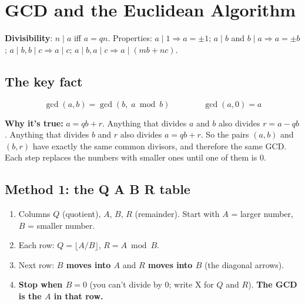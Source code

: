 \section{GCD and the Euclidean Algorithm}

\textbf{Divisibility}: $n \mid a$ iff $a = qn$. Properties: $a \mid 1 \Rightarrow a = \pm1$; $a \mid b$ and $b \mid a \Rightarrow a = \pm b$; $a \mid b, b \mid c \Rightarrow a \mid c$; $a \mid b, a \mid c \Rightarrow a \mid (mb + nc)$.

\subsection{The key fact}
\begin{keybox}
\vspace{-6pt}
\[
\gcd(a, b) = \gcd(b,\; a \bmod b) \qquad\qquad \gcd(a, 0) = a
\]
\end{keybox}
\textbf{Why it's true:} $a = qb + r$. Anything that divides $a$ and $b$ also divides $r = a - qb$. Anything that divides $b$ and $r$ also divides $a = qb + r$. So the pairs $(a, b)$ and $(b, r)$ have exactly the same common divisors, and therefore the same GCD. Each step replaces the numbers with smaller ones until one of them is 0.

\subsection{Method 1: the Q A B R table}
\begin{enumerate}[leftmargin=1.5em]
  \item Columns $Q$ (quotient), $A$, $B$, $R$ (remainder). Start with $A$ = larger number, $B$ = smaller number.
  \item Each row: $Q = \lfloor A/B \rfloor$, $R = A \bmod B$.
  \item Next row: \textbf{$B$ moves into $A$} and \textbf{$R$ moves into $B$} (the diagonal arrows).
  \item \textbf{Stop when $B = 0$} (you can't divide by 0; write X for $Q$ and $R$). \textbf{The GCD is the $A$ in that row.}
\end{enumerate}


